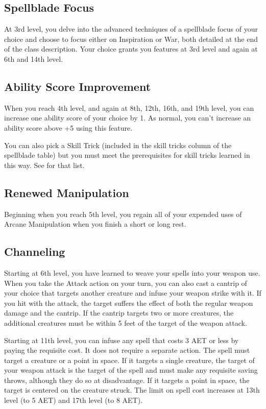 \subsection{Spellblade Focus}

At 3rd level, you delve into the advanced techniques of a spellblade focus of your choice and choose to focus either on Inspiration or War, both detailed at the end of the class description. Your choice grants you features at 3rd level and again at 6th and 14th level.

\subsection{Ability Score Improvement}

When you reach 4th level, and again at 8th, 12th, 16th, and 19th level, you can increase one ability score of your choice by 1. As normal, you can't increase an ability score above +5 using this feature.

You can also pick a Skill Trick (included in the skill tricks column of the spellblade table) but you must meet the prerequisites for skill tricks learned in this way. See  for that list.

\subsection{Renewed Manipulation}

Beginning when you reach 5th level, you regain all of your expended uses of Arcane Manipulation when you finish a short or long rest.

\subsection{Channeling}
Starting at 6th level, you have learned to weave your spells into your weapon use. When you take the Attack action on your turn, you can also cast a cantrip of your choice that targets another creature and infuse your weapon strike with it. If you hit with the attack, the target suffers the effect of both the regular weapon damage and the cantrip. If the cantrip targets two or more creatures, the additional creatures must be within 5 feet of the target of the weapon attack.

Starting at 11th level, you can infuse any spell that costs 3 AET or less by paying the requisite cost. It does not require a separate action. The spell must target a creature or a point in space. If it targets a single creature, the target of your weapon attack is the target of the spell and must make any requisite saving throws, although they do so at disadvantage. If it targets a point in space, the target is centered on the creature struck. The limit on spell cost increases at 13th level (to 5 AET) and 17th level (to 8 AET).

